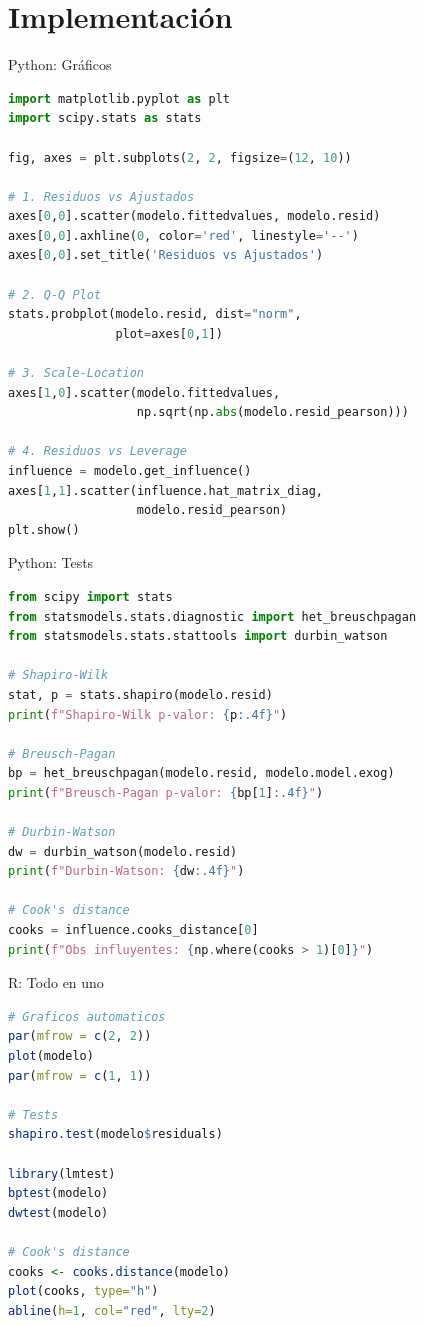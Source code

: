 \documentclass[aspectratio=169]{beamer}
\begin{document}
\section{Implementación}

\begin{frame}[fragile]{Python: Gráficos}
\begin{lstlisting}[language=Python]
import matplotlib.pyplot as plt
import scipy.stats as stats

fig, axes = plt.subplots(2, 2, figsize=(12, 10))

# 1. Residuos vs Ajustados
axes[0,0].scatter(modelo.fittedvalues, modelo.resid)
axes[0,0].axhline(0, color='red', linestyle='--')
axes[0,0].set_title('Residuos vs Ajustados')

# 2. Q-Q Plot
stats.probplot(modelo.resid, dist="norm", 
               plot=axes[0,1])

# 3. Scale-Location
axes[1,0].scatter(modelo.fittedvalues, 
                  np.sqrt(np.abs(modelo.resid_pearson)))

# 4. Residuos vs Leverage
influence = modelo.get_influence()
axes[1,1].scatter(influence.hat_matrix_diag, 
                  modelo.resid_pearson)
plt.show()
\end{lstlisting}
\end{frame}

\begin{frame}[fragile]{Python: Tests}
\begin{lstlisting}[language=Python]
from scipy import stats
from statsmodels.stats.diagnostic import het_breuschpagan
from statsmodels.stats.stattools import durbin_watson

# Shapiro-Wilk
stat, p = stats.shapiro(modelo.resid)
print(f"Shapiro-Wilk p-valor: {p:.4f}")

# Breusch-Pagan
bp = het_breuschpagan(modelo.resid, modelo.model.exog)
print(f"Breusch-Pagan p-valor: {bp[1]:.4f}")

# Durbin-Watson
dw = durbin_watson(modelo.resid)
print(f"Durbin-Watson: {dw:.4f}")

# Cook's distance
cooks = influence.cooks_distance[0]
print(f"Obs influyentes: {np.where(cooks > 1)[0]}")
\end{lstlisting}
\end{frame}

\begin{frame}[fragile]{R: Todo en uno}
\begin{lstlisting}[language=R]
# Graficos automaticos
par(mfrow = c(2, 2))
plot(modelo)
par(mfrow = c(1, 1))

# Tests
shapiro.test(modelo$residuals)

library(lmtest)
bptest(modelo)
dwtest(modelo)

# Cook's distance
cooks <- cooks.distance(modelo)
plot(cooks, type="h")
abline(h=1, col="red", lty=2)
\end{lstlisting}
\end{frame}
\end{document}
